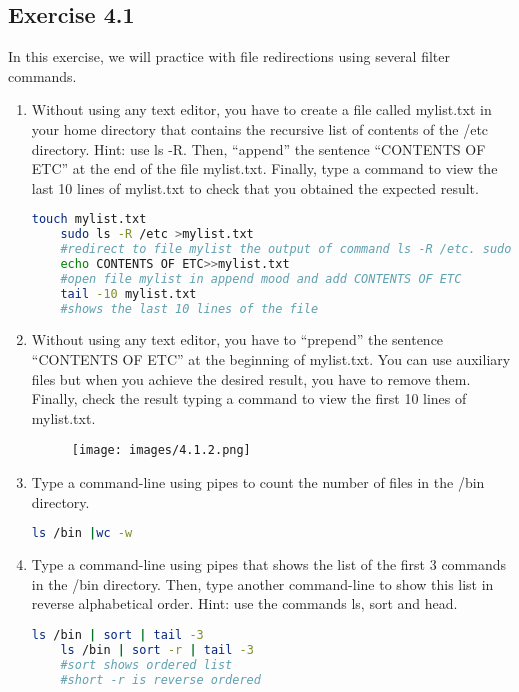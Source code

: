 \documentclass[12pt, titlepage,]{article}
\begin{document}
\subsection{Exercise 4.1}
 In this exercise, we will practice with file redirections using several filter commands. 
\begin{enumerate}
    \item  Without using any text editor, you have to create a file called mylist.txt in your home directory that contains the recursive list of contents of the /etc directory. Hint: use ls -R. Then, “append” the sentence “CONTENTS OF ETC” at the end of the file mylist.txt. Finally, type a command to view the last 10 lines of mylist.txt to check that you obtained the expected result.
    \begin{lstlisting}[language=Bash]
    touch mylist.txt
    sudo ls -R /etc >mylist.txt 
    #redirect to file mylist the output of command ls -R /etc. sudo because permission needed.
    echo CONTENTS OF ETC>>mylist.txt
    #open file mylist in append mood and add CONTENTS OF ETC
    tail -10 mylist.txt
    #shows the last 10 lines of the file
    \end{lstlisting}

    \item  Without using any text editor, you have to “prepend” the sentence “CONTENTS OF ETC” at the beginning of mylist.txt. You can use auxiliary files but when you achieve the desired result, you have to remove them. Finally, check the result typing a command to view the first 10 lines of mylist.txt. 
    \begin{figure}[h] %
    \centering
    {\texttt{[image: images/4.1.2.png]}}
    \end{figure} 
    \clearpage
    
    \item Type a command-line using pipes to count the number of files in the /bin directory. 
    \begin{lstlisting}[language=Bash]
    ls /bin |wc -w
    \end{lstlisting}

    \item Type a command-line using pipes that shows the list of the first 3 commands in the /bin directory. Then, type another command-line to show this list in reverse alphabetical order. Hint: use the commands ls, sort and head. 
    \begin{lstlisting}[language=Bash]
    ls /bin | sort | tail -3
    ls /bin | sort -r | tail -3
    #sort shows ordered list
    #short -r is reverse ordered 
    \end{lstlisting}


\end{enumerate}
\end{document}
